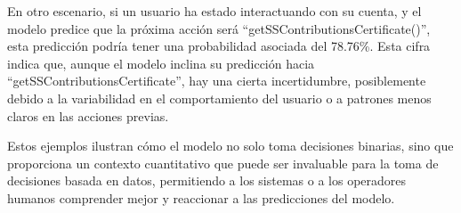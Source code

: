 En otro escenario, si un usuario ha estado interactuando con su cuenta, y el modelo predice que la próxima acción será \textquotedblleft getSSContributionsCertificate()\textquotedblright, esta predicción podría tener una probabilidad asociada del 78.76\%. Esta cifra indica que, aunque el modelo inclina su predicción hacia \textquotedblleft getSSContributionsCertificate\textquotedblright, hay una cierta incertidumbre, posiblemente debido a la variabilidad en el comportamiento del usuario o a patrones menos claros en las acciones previas.

Estos ejemplos ilustran cómo el modelo no solo toma decisiones binarias, sino que proporciona un contexto cuantitativo que puede ser invaluable para la toma de decisiones basada en datos, permitiendo a los sistemas o a los operadores humanos comprender mejor y reaccionar a las predicciones del modelo.